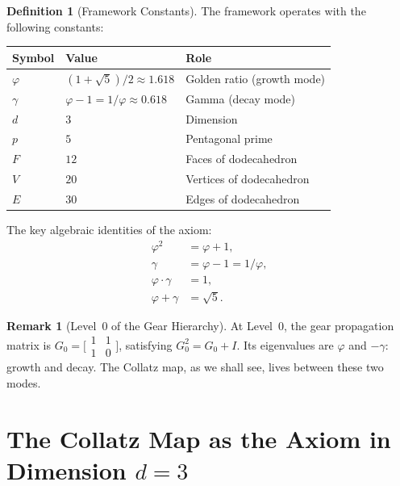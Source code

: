 \documentclass[11pt,a4paper]{article}
\theoremstyle{definition}
\newtheorem{definition}[theorem]{Definition}
\newtheorem{remark}[theorem]{Remark}
\newcommand{\gam}{\gamma}
\begin{document}
\begin{definition}[Framework Constants]
The framework operates with the following constants:
\begin{center}
\begin{tabular}{lll}
  \toprule
  Symbol & Value & Role \\
  \midrule
  $\varphi$ & $(1+\sqrt{5})/2 \approx 1.618$ & Golden ratio (growth mode) \\
  $\gam$ & $\varphi - 1 = 1/\varphi \approx 0.618$ & Gamma (decay mode) \\
  $d$ & $3$ & Dimension \\
  $p$ & $5$ & Pentagonal prime \\
  $F$ & $12$ & Faces of dodecahedron \\
  $V$ & $20$ & Vertices of dodecahedron \\
  $E$ & $30$ & Edges of dodecahedron \\
  \bottomrule
\end{tabular}
\end{center}
\end{definition}

The key algebraic identities of the axiom:
\begin{align}
  \varphi^2 &= \varphi + 1, \label{eq:phi-sq} \\
  \gam &= \varphi - 1 = 1/\varphi, \label{eq:gamma-def} \\
  \varphi \cdot \gam &= 1, \label{eq:phi-gamma} \\
  \varphi + \gam &= \sqrt{5}. \label{eq:phi-plus-gamma}
\end{align}

\begin{remark}[Level~0 of the Gear Hierarchy]
At Level~0, the gear propagation matrix is
$G_0 = \bigl[\begin{smallmatrix} 1 & 1 \\ 1 & 0 \end{smallmatrix}\bigr]$,
satisfying $G_0^2 = G_0 + I$. Its eigenvalues are $\varphi$ and $-\gam$:
growth and decay. The Collatz map, as we shall see, lives between these two
modes.
\end{remark}

\section{The Collatz Map as the Axiom in Dimension \texorpdfstring{$d = 3$}{d=3}}\label{sec:reformulation}
\end{document}
